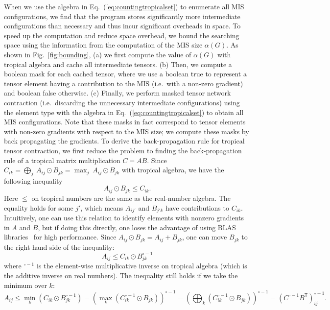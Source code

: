 \documentclass[onefignum, onetabnum]{siamart190516}
\newcommand{\<}{\langle}
\renewcommand{\>}{\rangle}
\newcommand{\Eq}[1]{Eq.~(\ref{#1})}
\newcommand{\Fig}[1]{Fig.~\ref{#1}}
\begin{document}
When we use the algebra in \Eq{eq:countingtropicalset} to enumerate all MIS configurations, we find that the program stores significantly more intermediate configurations than necessary and thus incur significant overheads in space.
To speed up the computation and reduce space overhead, we bound the searching space using the information from the computation of the MIS size $\alpha(G)$.
As shown in \Fig{fig:bounding}, (a) we first compute the value of $\alpha(G)$ with tropical algebra and cache all intermediate tensors.
(b) Then, we compute a boolean mask for each cached tensor, where we use a boolean true to represent a tensor element having a contribution to the MIS (i.e.\ with a non-zero gradient) and boolean false otherwise.
(c) Finally, we perform masked tensor network contraction (i.e.\ discarding the unnecessary intermediate configurations) using the element type with the algebra in \Eq{eq:countingtropicalset} to obtain all MIS configurations.
Note that these masks in fact correspond to tensor elements with non-zero gradients with respect to the MIS size; we compute these masks by back propagating the gradients.
To derive the back-propagation rule for tropical tensor contraction,
we first reduce the problem to finding the back-propagation rule of a tropical matrix multiplication $C = A B$.
Since $ C_{ik} = \bigoplus_{j} \ A_{ij} \odot B_{jk} = \max_{j} \ A_{ij} \odot B_{jk}$ with tropical algebra, we have the following inequality
\begin{equation}
    A_{ij} \odot B_{jk} \leq C_{ik}.
\end{equation}
Here $\leq$ on tropical numbers are the same as the real-number algebra.
The equality holds for some $j'$, which means $A_{ij'}$ and $B_{j'k}$ have contributions to $C_{ik}$.
Intuitively, one can use this relation to identify elements with nonzero gradients in $A$ and $B$,
but if doing this directly, one loses the advantage of using BLAS libraries~\cite{TropicalGEMM} for high performance.
Since $A_{ij} \odot B_{jk} = A_{ij} + B_{jk}$, one can move $B_{jk}$ to the right hand side of the inequality: 
\begin{equation}
    A_{ij} \leq C_{ik} \odot B_{jk}^{\circ -1}
\end{equation}
where ${}^{\circ -1}$ is the element-wise multiplicative inverse on tropical algebra (which is the additive inverse on real numbers).
The inequality still holds if we take the minimum over $k$: 
\begin{equation}
    A_{ij} \leq \min_{k}(C_{ik} \odot B_{jk}^{\circ -1}) = \left(\max_{k} \left(C_{ik}^{\circ -1} \odot B_{jk} \right) \right)^{\circ -1} = \left(\bigoplus_{k} \left(C_{ik}^{\circ -1} \odot B_{jk} \right) \right)^{\circ -1} = \left( C^{\circ-1} B^{\mathsf{T}} \right)^{\circ -1}_{ij}.
\end{equation}
\end{document}
